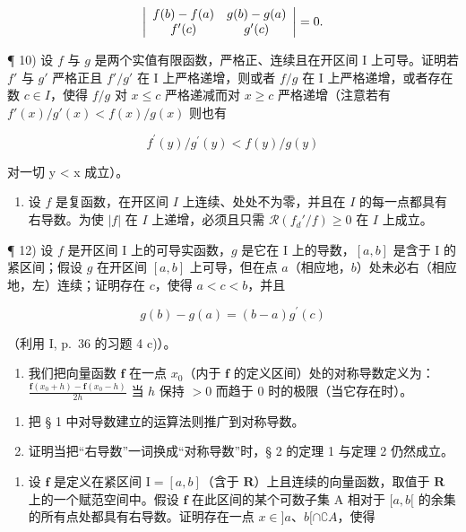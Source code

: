 \[
\left| \begin{array}{c c} f (b) - f (a) & g (b) - g (a) \\ f ^ {\prime} (c) & g ^ {\prime} (c) \end{array} \right| = 0.
\]

¶ 10) 设 \(f\) 与 \(g\) 是两个实值有限函数，严格正、连续且在开区间 I 上可导。证明若 \(f'\) 与 \(g'\) 严格正且 \(f'/g'\) 在 I 上严格递增，则或者 \(f/g\) 在 I 上严格递增，或者存在数 \(c \in I\)，使得 \(f / g\) 对 \(x \leqslant c\) 严格递减而对 \(x \geqslant c\) 严格递增（注意若有 \(f'(x) / g'(x) < f(x) / g(x)\) 则也有

\[
f ^ {\prime} (y) / g ^ {\prime} (y) <   f (y) / g (y)
\]

对一切 y \textless{} x 成立）。

\begin{enumerate}
\def\labelenumi{\arabic{enumi})}
\setcounter{enumi}{10}
\tightlist
\item
  设 \(f\) 是复函数，在开区间 \(I\) 上连续、处处不为零，并且在 \(I\) 的每一点都具有右导数。为使 \(|f|\) 在 \(I\) 上递增，必须且只需 \(\mathcal{R}(f_d' / f) \geqslant 0\) 在 \(I\) 上成立。
\end{enumerate}

¶ 12) 设 \(f\) 是开区间 I 上的可导实函数，\(g\) 是它在 I 上的导数，\([a, b]\) 是含于 I 的紧区间；假设 \(g\) 在开区间 \([a, b]\) 上可导，但在点 \(a\)（相应地，\(b\)）处未必右（相应地，左）连续；证明存在 \(c\)，使得 \(a < c < b\)，并且

\[
g (b) - g (a) = (b - a) g ^ {\prime} (c)
\]

（利用 I, p.~36 的习题 4 c)）。

\begin{enumerate}
\def\labelenumi{\arabic{enumi})}
\setcounter{enumi}{12}
\tightlist
\item
  我们把向量函数 \(\mathbf{f}\) 在一点 \(x_0\)（内于 \(\mathbf{f}\) 的定义区间）处的对称导数定义为：\(\frac{\mathbf{f}(x_0 + h) - \mathbf{f}(x_0 - h)}{2h}\) 当 \(h\) 保持 \(>0\) 而趋于 0 时的极限（当它存在时）。
\end{enumerate}

\begin{enumerate}
\def\labelenumi{\alph{enumi})}
\item
  把 § 1 中对导数建立的运算法则推广到对称导数。
\item
  证明当把“右导数”一词换成“对称导数”时，§ 2 的定理 1 与定理 2 仍然成立。
\end{enumerate}

\begin{enumerate}
\def\labelenumi{\arabic{enumi})}
\setcounter{enumi}{13}
\tightlist
\item
  设 \(\mathbf{f}\) 是定义在紧区间 \(\mathrm{I} = [a, b]\)（含于 \(\mathbf{R}\)）上且连续的向量函数，取值于 \(\mathbf{R}\) 上的一个赋范空间中。假设 \(\mathbf{f}\) 在此区间的某个可数子集 A 相对于 \([a, b[\) 的余集的所有点处都具有右导数。证明存在一点 \(x \in ]a\)、\(b[\cap ∁A\)，使得
\end{enumerate}

